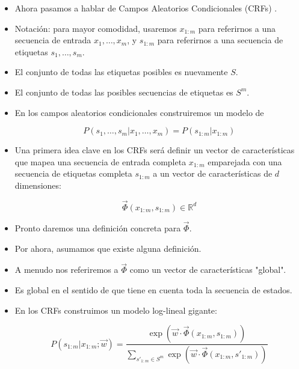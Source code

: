 \begin{itemize}

\item Ahora pasamos a hablar de Campos Aleatorios Condicionales (CRFs) \cite{LaffertyMP01}.

\item Notación: para mayor comodidad, usaremos $x_{1:m}$ para referirnos a una secuencia de entrada $x_1, \dots, x_m$, y $s_{1:m}$ para referirnos a una secuencia de etiquetas $s_1, \dots, s_m$.

\item El conjunto de todas las etiquetas posibles es nuevamente $S$.

\item El conjunto de todas las posibles secuencias de etiquetas es $S^m$.

\item En los campos aleatorios condicionales construiremos un modelo de

\begin{displaymath}
P(s_1, \dots, s_m | x_1, \dots, x_m) = P(s_{1:m}|x_{1:m})
\end{displaymath}

\item Una primera idea clave en los CRFs será definir un vector de características que mapea una secuencia de entrada completa $x_{1:m}$ emparejada con una secuencia de etiquetas completa $s_{1:m}$ a un vector de características de $d$ dimensiones:

\begin{displaymath}
\vec{\Phi}(x_{1:m},s_{1:m}) \in \mathbb{R}^d
\end{displaymath}

\item Pronto daremos una definición concreta para $\vec{\Phi}$.
\item Por ahora, asumamos que existe alguna definición.
\item A menudo nos referiremos a $\vec{\Phi}$ como un vector de características "global".
\item Es global en el sentido de que tiene en cuenta toda la secuencia de estados.

\item En los CRFs construimos un modelo log-lineal gigante:

\begin{displaymath}
P(s_{1:m}|x_{1:m}; \vec{w}) = \frac{\exp (\vec{w} \cdot \vec{\Phi}(x_{1:m},s_{1:m}))}{\sum_{s'_{1:m} \in S^m}\exp (\vec{w} \cdot \vec{\Phi}(x_{1:m},s'_{1:m}))}
\end{displaymath}


\end{itemize}
